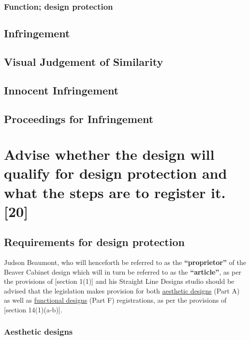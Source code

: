 \documentclass[11pt]{article}
\begin{document}
\subsubsection{Function; design protection}
\label{sec:org21c9377}

\subsection{Infringement}
\label{sec:org6c8bcfb}

\subsection{Visual Judgement of Similarity}
\label{sec:orge5fa28d}

\subsection{Innocent Infringement}
\label{sec:org150888f}

\subsection{Proceedings for Infringement}
\label{sec:orgf629017}



\section{Advise whether the design will qualify for design protection and what the steps are to register it. [20]}
\label{sec:org82d2cb4}


\subsection{Requirements for design protection}
\label{sec:org94643b4}

Judson Beaumont, who will henceforth be referred to as the \textbf{``proprietor''} of
the Beaver Cabinet design which will in turn be referred to as the \textbf{``article''}, as
per the provisions of [section 1(1)]\cite{rsa93_designs_act} and his Straight Line
Designs studio should be advised that the legislation makes provision for both
\uline{aesthetic designs} (Part A) as well as \uline{functional designs} (Part F)
registrations, as per the provisions of [section
14(1)(a-b)]\cite{rsa93_designs_act}.

\subsubsection{Aesthetic designs}
\label{sec:org0c8584f}
\end{document}
